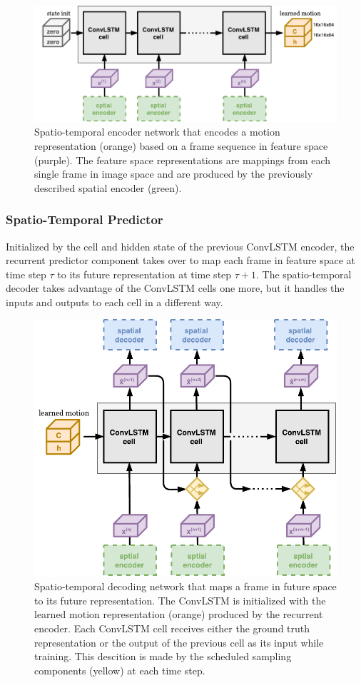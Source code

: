 \begin{figure}[htb]
	\centering
	\includegraphics[width=0.9\linewidth]{figures/comp_spatiotemp_encoder.pdf} 
	\caption[Spatio-Temporal Encoding Component]{Spatio-temporal encoder network that encodes a motion representation (orange) based on a frame sequence in feature space (purple). The feature space representations are mappings from each single frame in image space and are produced by the previously described spatial encoder (green).} \label{fig:comp-spatiotemp_encoder}
\end{figure}

\subsubsection{Spatio-Temporal Predictor}

Initialized by the cell and hidden state of the previous ConvLSTM encoder, the recurrent predictor component takes over to map each frame in feature space at time step $\tau$ to its future representation at time step $\tau + 1$. The spatio-temporal decoder takes advantage of the ConvLSTM cells one more, but it handles the inputs and outputs to each cell in a different way.

\begin{figure}[htb]
	\centering
	\includegraphics[width=0.8\linewidth]{figures/comp_spatiotemp_decoder.pdf} 
	\caption[Spatio-Temporal Predictor Component]{Spatio-temporal decoding network that maps a frame in future space to its future representation. The ConvLSTM is initialized with the learned motion representation (orange) produced by the recurrent encoder. Each ConvLSTM cell receives either the ground truth representation or the output of the previous cell as its input while training. This descition is made by the scheduled sampling components (yellow) at each time step.} \label{fig:comp-spatiotemp_predictor}
\end{figure}

